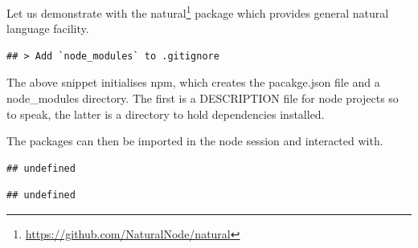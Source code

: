 \documentclass[
]{krantz}
\makeatletter
\newenvironment{Shaded}{\begin{snugshade}}{\end{snugshade}}
\newcommand{\CommentTok}[1]{\textcolor[rgb]{0.37,0.37,0.37}{\textit{#1}}}
\newcommand{\KeywordTok}[1]{\textcolor[rgb]{0.27,0.27,0.27}{\textbf{#1}}}
\newcommand{\NormalTok}[1]{#1}
\newcommand{\OperatorTok}[1]{\textcolor[rgb]{0.43,0.43,0.43}{\textbf{#1}}}
\newcommand{\StringTok}[1]{\textcolor[rgb]{0.5,0.5,0.5}{#1}}
\renewcommand{\href}[2]{#2\footnote{\url{#1}}}
\newenvironment{kframe}{%
\medskip{}
\setlength{\fboxsep}{.8em}
 \def\at@end@of@kframe{}%
 \ifinner\ifhmode%
  \def\at@end@of@kframe{\end{minipage}}%
  \begin{minipage}{\columnwidth}%
 \fi\fi%
 \def\FrameCommand##1{\hskip\@totalleftmargin \hskip-\fboxsep
 \colorbox{shadecolor}{##1}\hskip-\fboxsep
     \hskip-\linewidth \hskip-\@totalleftmargin \hskip\columnwidth}%
 \MakeFramed {\advance\hsize-\width
   \@totalleftmargin\z@ \linewidth\hsize
   \@setminipage}}%
 {\par\unskip\endMakeFramed%
 \at@end@of@kframe}
\renewenvironment{Shaded}{\begin{kframe}}{\end{kframe}}
\makeatother
\begin{document}
Let us demonstrate with the \href{https://github.com/NaturalNode/natural}{natural} package which provides general natural language facility.

\begin{Shaded}
\end{Shaded}

\begin{verbatim}
## > Add `node_modules` to .gitignore
\end{verbatim}

The above snippet initialises npm, which creates the pacakge.json file and a node\_modules directory. The first is a DESCRIPTION file for node projects so to speak, the latter is a directory to hold dependencies installed.

The packages can then be imported in the node session and interacted with.

\begin{Shaded}
\end{Shaded}

\begin{verbatim}
## undefined
\end{verbatim}

\begin{Shaded}
\end{Shaded}

\begin{verbatim}
## undefined
\end{verbatim}

\begin{Shaded}
\end{Shaded}
\end{document}
